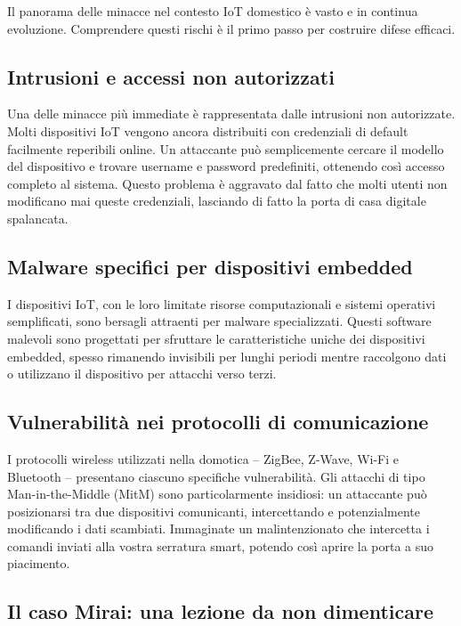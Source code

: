 Il panorama delle minacce nel contesto IoT domestico è vasto e in continua evoluzione. Comprendere questi rischi è il primo passo per costruire difese efficaci.

\subsection{Intrusioni e accessi non autorizzati}

Una delle minacce più immediate è rappresentata dalle intrusioni non autorizzate. Molti dispositivi IoT vengono ancora distribuiti con credenziali di default facilmente reperibili online. Un attaccante può semplicemente cercare il modello del dispositivo e trovare username e password predefiniti, ottenendo così accesso completo al sistema. Questo problema è aggravato dal fatto che molti utenti non modificano mai queste credenziali, lasciando di fatto la porta di casa digitale spalancata.

\subsection{Malware specifici per dispositivi embedded}

I dispositivi IoT, con le loro limitate risorse computazionali e sistemi operativi semplificati, sono bersagli attraenti per malware specializzati. Questi software malevoli sono progettati per sfruttare le caratteristiche uniche dei dispositivi embedded, spesso rimanendo invisibili per lunghi periodi mentre raccolgono dati o utilizzano il dispositivo per attacchi verso terzi.

\subsection{Vulnerabilità nei protocolli di comunicazione}

I protocolli wireless utilizzati nella domotica -- ZigBee, Z-Wave, Wi-Fi e Bluetooth -- presentano ciascuno specifiche vulnerabilità. Gli attacchi di tipo Man-in-the-Middle (MitM) sono particolarmente insidiosi: un attaccante può posizionarsi tra due dispositivi comunicanti, intercettando e potenzialmente modificando i dati scambiati. Immaginate un malintenzionato che intercetta i comandi inviati alla vostra serratura smart, potendo così aprire la porta a suo piacimento.

\subsection{Il caso Mirai: una lezione da non dimenticare}

